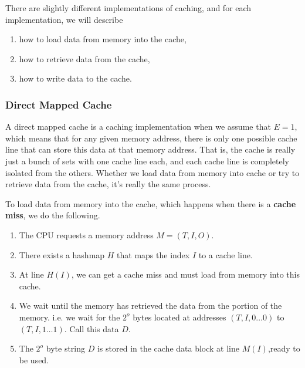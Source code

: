 \documentclass{article}
\begin{document}
      There are slightly different implementations of caching, and for each implementation, we will describe 
      \begin{enumerate}
        \item how to load data from memory into the cache, 
        \item how to retrieve data from the cache, 
        \item how to write data to the cache. 
      \end{enumerate}

    \subsubsection{Direct Mapped Cache} 

      A direct mapped cache is a caching implementation when we assume that $E = 1$, which means that for any given memory address, there is only one possible cache line that can store this data at that memory address. That is, the cache is really just a bunch of sets with one cache line each, and each cache line is completely isolated from the others. Whether we load data from memory into cache or try to retrieve data from the cache, it's really the same process. 

      \begin{theorem}[Placement]
        To load data from memory into the cache, which happens when there is a \textbf{cache miss}, we do the following. 
        \begin{enumerate}
          \item The CPU requests a memory address $M = (T, I, O)$. 
          \item There exists a hashmap $H$ that maps the index $I$ to a cache line. 
          \item At line $H(I)$, we can get a cache miss and must load from memory into this cache. 
          \item We wait until the memory has retrieved the data from the portion of the memory. i.e. we wait for the $2^o$ bytes located at addresses $(T, I, 0\ldots 0)$ to $(T, I, 1\ldots 1)$. Call this data $D$. 
          \item The $2^o$ byte string $D$ is stored in the cache data block at line $M(I)$,ready to be used. 
        \end{enumerate}
      \end{theorem}
\end{document}
